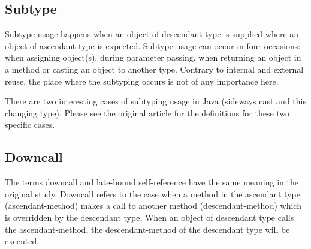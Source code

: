 \documentclass [11pt, parskip=full] {article}
\begin{document}
\subsection{Subtype}
Subtype usage happens when an object of descendant type is supplied where an object of ascendant type is expected. Subtype usage can occur in four occasions: when assigning object(s), during parameter passing, when returning an object in a method or casting an object to another type. Contrary to internal and external reuse, the place where the subtyping occurs is not of any importance here.

There are two interesting cases of subtyping usage in Java (sideways cast and this changing type). Please see the original article \cite{TemperoYN13} for the definitions for these two specific cases.

\subsection{Downcall}
The terms downcall and late-bound self-reference have the same meaning in the original study. Downcall refers to the case when a method in the ascendant type (ascendant-method) makes a call to another method (descendant-method) which is overridden by the descendant type. When an object of descendant type calls the ascendant-method, the descendant-method of the descendant type will be executed.
\end{document}
